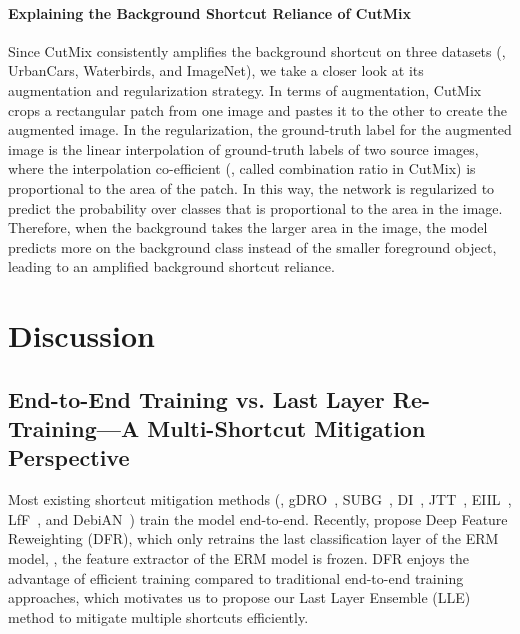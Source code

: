 \documentclass[10pt,twocolumn,letterpaper]{article}
\begin{document}
\paragraph{Explaining the Background Shortcut Reliance of CutMix} Since CutMix consistently amplifies the background shortcut on three datasets (\ie, UrbanCars, Waterbirds, and ImageNet), we take a closer look at its augmentation and regularization strategy. In terms of augmentation, CutMix crops a rectangular patch from one image and pastes it to the other to create the augmented image. In the regularization, the ground-truth label for the augmented image is the linear interpolation of ground-truth labels of two source images, where the interpolation co-efficient (\ie, called combination ratio  in CutMix) is proportional to the area of the patch. In this way, the network is regularized to predict the probability over classes that is proportional to the area in the image. Therefore, when the background takes the larger area in the image, the model predicts more on the background class instead of the smaller foreground object, leading to an amplified background shortcut reliance.


\section{Discussion}
\label{appx:discussion}


\subsection{End-to-End Training vs. Last Layer Re-Training---A Multi-Shortcut Mitigation Perspective}

Most existing shortcut mitigation methods (\eg, gDRO~\cite{sagawa2020Int.Conf.Learn.Represent.Distributionally}, SUBG~\cite{idrissi2022Conf.CausalLearn.Reason.Simple}, DI~\cite{wang2020IEEECVFConf.Comput.Vis.PatternRecognit.CVPRFairness}, JTT~\cite{liu2021Int.Conf.Mach.Learn.Just}, EIIL~\cite{creager2021Int.Conf.Mach.Learn.Environment}, LfF~\cite{nam2020Adv.NeuralInf.Process.Syst.Learning}, and DebiAN~\cite{li2022Eur.Conf.Comput.Vis.ECCVDiscovera}) train the model end-to-end. Recently, \citet{kirichenko2022Last} propose Deep Feature Reweighting (DFR), which only retrains the last classification layer of the ERM model, \ie, the feature extractor of the ERM model is frozen. DFR enjoys the advantage of efficient training compared to traditional end-to-end training approaches, which motivates us to propose our Last Layer Ensemble (LLE) method to mitigate multiple shortcuts efficiently.
\end{document}
